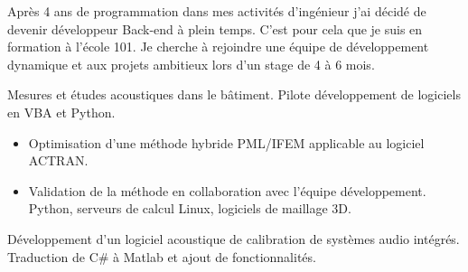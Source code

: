 \documentclass[10pt,a4paper]{altacv}
\begin{document}


\begin{fullwidth}
\makecvheader
\begin{adjustwidth}{30pt}{30pt}
Apr\`es 4 ans de programmation dans mes activit\'es d'ing\'enieur j'ai d\'ecid\'e de devenir d\'eveloppeur Back-end \`a plein temps. C'est pour cela que je suis en formation \`a l'\'ecole 101. Je cherche \`a rejoindre une \'equipe de d\'eveloppement dynamique et aux projets ambitieux lors d'un stage de 4 \`a 6 mois.
\end{adjustwidth}
\end{fullwidth}




Mesures et \'etudes acoustiques dans le b\^atiment. Pilote d\'eveloppement de logiciels en VBA et Python.

\divider

\begin{itemize}
\item Optimisation d'une m\'ethode hybride PML/IFEM applicable au logiciel ACTRAN.
\item Validation de la m\'ethode en collaboration avec l'\'equipe d\'eveloppement. Python, serveurs de calcul Linux, logiciels de maillage 3D.
\end{itemize}

\divider

D\'eveloppement d'un logiciel acoustique de calibration de syst\`emes audio int\'egr\'es. Traduction de C\# \`a
Matlab et ajout de fonctionnalit\'es.
\end{document}
